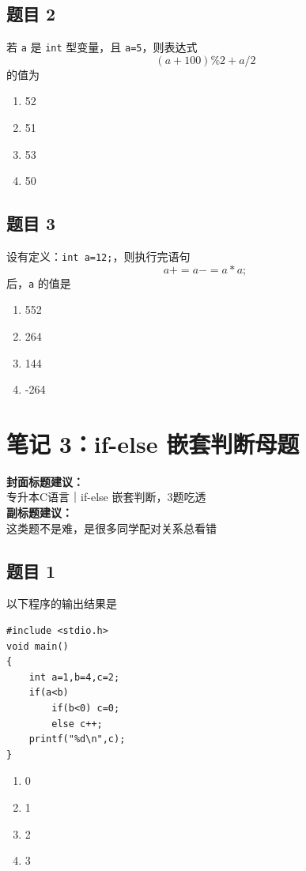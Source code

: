 \documentclass[12pt,a4paper]{ctexart}
\begin{document}
\subsection*{题目 2}
若 \texttt{a} 是 \texttt{int} 型变量，且 \texttt{a=5}，则表达式
\[
(a+100)\%2 + a/2
\]
的值为
\begin{enumerate}[label=\Alph*.]
    \item 52
    \item 51
    \item 53
    \item 50
\end{enumerate}

\subsection*{题目 3}
设有定义：\texttt{int a=12;}，则执行完语句
\[
a += a -= a*a;
\]
后，\texttt{a} 的值是
\begin{enumerate}[label=\Alph*.]
    \item 552
    \item 264
    \item 144
    \item -264
\end{enumerate}

\newpage

\section{笔记 3：if-else 嵌套判断母题}
\begin{coverbox}
\textbf{封面标题建议：}\\
专升本C语言｜if-else 嵌套判断，3题吃透\\
\textbf{副标题建议：}\\
这类题不是难，是很多同学配对关系总看错
\end{coverbox}

\subsection*{题目 1}
以下程序的输出结果是
\begin{lstlisting}
#include <stdio.h>
void main()
{
    int a=1,b=4,c=2;
    if(a<b)
        if(b<0) c=0;
        else c++;
    printf("%d\n",c);
}
\end{lstlisting}

\begin{enumerate}[label=\Alph*.]
    \item 0
    \item 1
    \item 2
    \item 3
\end{enumerate}
\end{document}
